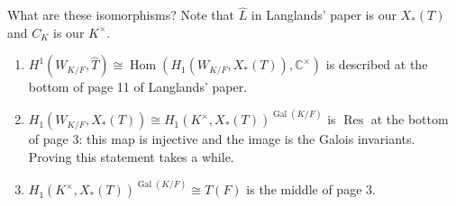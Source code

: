 \documentclass{article}
\DeclareMathOperator{\Hom}{Hom}
\DeclareMathOperator{\Gal}{Gal}
\DeclareMathOperator{\Res}{Res}
\newcommand{\CC}{\mathbb{C}}
\begin{document}
What are these isomorphisms?  Note that $\hat{L}$ in Langlands' paper is our $X_*(T)$ and $C_K$ is our $K^\times$.
\begin{enumerate}
\item $H^1(W_{K/F}, \hat{T}) \cong \Hom(H_1(W_{K/F}, X_*(T)), \CC^\times)$ is described at the bottom of page 11 of Langlands' paper.
\item $H_1(W_{K/F}, X_*(T)) \cong H_1(K^\times, X_*(T))^{\Gal(K/F)}$ is $\Res$ at the bottom of page 3: this map is injective and the image is the Galois invariants.  Proving this statement takes a while.
\item $H_1(K^\times, X_*(T))^{\Gal(K/F)} \cong T(F)$ is the middle of page 3.
\end{enumerate}
\end{document}

